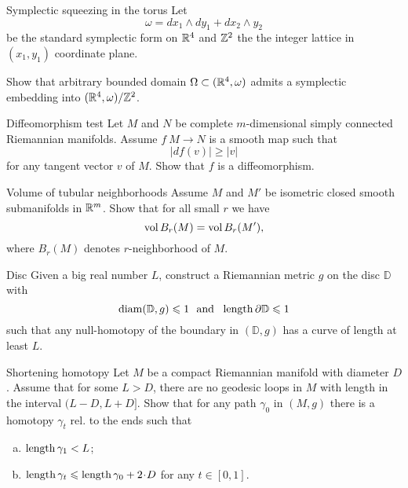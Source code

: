 \documentclass[twoside]{book}
\begin{document}
\begin{pr}{}{Symplectic squeezing in the torus}\label{Symplectic squeezing in the torus}
Let 
\[\omega=dx_1\wedge dy_1+ dx_2\wedge y_2\]
be the standard symplectic form on $\mathbb{R}^4$
and $\mathbb{Z}^2$ the the integer lattice in $(x_1,y_1)$ coordinate plane.

Show that arbitrary bounded domain $\Omega\subset (\mathbb{R}^4,\omega)$
admits a symplectic embedding into $(\mathbb{R}^4,\omega)/\mathbb{Z}^2$. 
\end{pr}


\begin{pr}{\easy}{Diffeomorphism test}\label{Diffeomorphism test}
Let $M$ and $N$ be 
complete 
$m$-dimensional
simply connected 
Riemannian manifolds.
Assume $f\:M\to N$
is a smooth map such that 
$$|df(v)|\ge |v|$$
for any tangent vector $v$ of $M$.
Show that $f$ is a diffeomorphism.
\end{pr}

\begin{pr}{}{Volume of tubular neighborhoods}\label{Volume of tubular neighborhoods}
Assume $M$ and $M'$ be isometric closed smooth submanifolds in $\mathbb{R}^m$.
Show that for all small $r$ we have
$$\operatorname{\rm vol} B_r(M)=\operatorname{\rm vol} B_r(M'),$$
where $B_r(M)$ denotes $r$-neighborhood of $M$.
\end{pr}

\begin{pr}{\hard}{Disc}\label{Disc}
Given a big real number $L$,
construct a Riemannian metric $g$ on the disc $\mathbb D$ 
with 
\[\diam(\mathbb D,g)\le 1
\ \ 
\text{and}
\ \ 
\length \partial\mathbb D\le 1  \]
such that any null-homotopy of the boundary in $(\mathbb D,g)$ 
has a curve of length at least $L$.
\end{pr}

\begin{pr}{\thm}{Shortening homotopy}\label{short-homotopy}
Let $M$ be a compact Riemannian manifold with diameter $D$.
Assume that for some $L>D$,
there are no geodesic loops in $M$
with length in the interval $(L-D,L+ D]$.
Show that for any path $\gamma_0$ in $(M,g)$
there is a homotopy $\gamma_t$ rel. to the ends
such that 
\begin{enumerate}[a)]
\item $\operatorname{\rm length} \gamma_1<L$;
\item $\length \gamma_t\le \length \gamma_0+2\cdot D$ for any $t\in[0,1]$.
 
\end{enumerate}
\end{pr}
\end{document}
